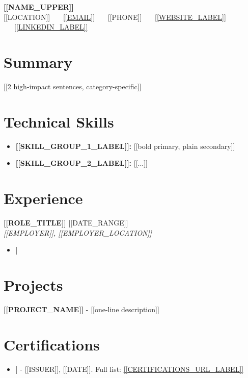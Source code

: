 \documentclass[10pt,a4paper]{article}
\begin{document}
\begin{center}
  {\fontsize{14}{16.5}\selectfont \textbf{\color{primary} [[NAME\_UPPER]]}}\\[1pt]
  \small
  [[LOCATION]] \ \textbar\ \
  \href{mailto:[[EMAIL]]}{[[EMAIL]]} \ \textbar\ \
  [[PHONE]] \ \textbar\ \
  \href{[[WEBSITE]]}{[[WEBSITE\_LABEL]]} \ \textbar\ \
  \href{[[LINKEDIN]]}{[[LINKEDIN\_LABEL]]}
\end{center}

\vspace{-4pt}

\section*{Summary}
[[2 high-impact sentences, category-specific]]

\section*{Technical Skills}
\begin{itemize}
  \item \textbf{[[SKILL\_GROUP\_1\_LABEL]]:} [[bold primary, plain secondary]]
  \item \textbf{[[SKILL\_GROUP\_2\_LABEL]]:} [[...]]
\end{itemize}

\section*{Experience}
\textbf{[[ROLE\_TITLE]]} \hfill [[DATE\_RANGE]] \\
\textit{[[EMPLOYER]], [[EMPLOYER\_LOCATION]]}
\begin{itemize}
  \item [[bullet]]
\end{itemize}

\section*{Projects}
\textbf{[[PROJECT\_NAME]]} - [[one-line description]]

\section*{Certifications}
\begin{itemize}
  \item [[CERT\_NAME]] - [[ISSUER]], [[DATE]]. Full list: \href{[[CERTIFICATIONS\_URL]]}{[[CERTIFICATIONS\_URL\_LABEL]]}
\end{itemize}
\end{document}
